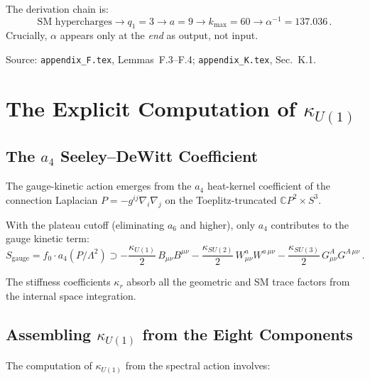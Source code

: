 \documentclass[12pt,a4paper]{article}
\begin{document}
The derivation chain is:
\begin{equation}
\text{SM hypercharges} \to q_1 = 3 \to a = 9
\to k_{\max} = 60 \to \alpha^{-1} = 137.036\,.
\end{equation}
Crucially, $\alpha$ appears only at the \emph{end} as output, not input.

Source: \texttt{appendix\_F.tex}, Lemmas~F.3--F.4;
\texttt{appendix\_K.tex}, Sec.~K.1.

\section{The Explicit Computation of $\kappa_{U(1)}$}
\label{sec:computation}

\subsection{The $a_4$ Seeley--DeWitt Coefficient}

The gauge-kinetic action emerges from the $a_4$ heat-kernel coefficient
of the connection Laplacian $P = -g^{ij}\nabla_i\nabla_j$ on the
Toeplitz-truncated $\mathbb{C}P^2 \times S^3$.

With the plateau cutoff (eliminating $a_6$ and higher), only $a_4$
contributes to the gauge kinetic term:
\begin{equation}
S_{\mathrm{gauge}} = f_0 \cdot a_4(P/\Lambda^2)
\supset -\frac{\kappa_{U(1)}}{2}\,B_{\mu\nu}B^{\mu\nu}
  - \frac{\kappa_{SU(2)}}{2}\,W_{\mu\nu}^a W^{a\,\mu\nu}
  - \frac{\kappa_{SU(3)}}{2}\,G_{\mu\nu}^A G^{A\,\mu\nu}\,.
\end{equation}

The stiffness coefficients $\kappa_r$ absorb all the geometric
and SM trace factors from the internal space integration.

\subsection{Assembling $\kappa_{U(1)}$ from the Eight Components}

The computation of $\kappa_{U(1)}$ from the spectral action involves:
\end{document}
